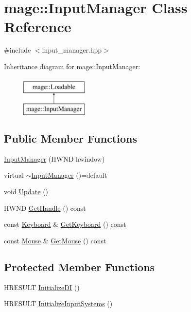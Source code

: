\hypertarget{classmage_1_1_input_manager}{}\section{mage\+:\+:Input\+Manager Class Reference}
\label{classmage_1_1_input_manager}


{\ttfamily \#include $<$input\+\_\+manager.\+hpp$>$}

Inheritance diagram for mage\+:\+:Input\+Manager\+:\begin{figure}[H]
\begin{center}
\leavevmode
\includegraphics[height=2.000000cm]{classmage_1_1_input_manager}
\end{center}
\end{figure}
\subsection*{Public Member Functions}
\begin{DoxyCompactItemize}
\item 
\hyperlink{classmage_1_1_input_manager_afc28df27a0251c242113a9761c007534}{Input\+Manager} (H\+W\+ND hwindow)
\item 
virtual \hyperlink{classmage_1_1_input_manager_a6e6e612b3b2bacb4ee5d0fcfde35a275}{$\sim$\+Input\+Manager} ()=default
\item 
void \hyperlink{classmage_1_1_input_manager_a5e516969ff4ae9876b98c28f48f93726}{Update} ()
\item 
H\+W\+ND \hyperlink{classmage_1_1_input_manager_a25d5f7f06b1c9d252d44d476f04b5ce3}{Get\+Handle} () const
\item 
const \hyperlink{classmage_1_1_keyboard}{Keyboard} \& \hyperlink{classmage_1_1_input_manager_a1702868136ae35014f27357b5b0f5ce8}{Get\+Keyboard} () const
\item 
const \hyperlink{classmage_1_1_mouse}{Mouse} \& \hyperlink{classmage_1_1_input_manager_a79f8294128ccd710ad80571483377067}{Get\+Mouse} () const
\end{DoxyCompactItemize}
\subsection*{Protected Member Functions}
\begin{DoxyCompactItemize}
\item 
H\+R\+E\+S\+U\+LT \hyperlink{classmage_1_1_input_manager_af3ca0717e37916463cc4f40c7d174b33}{Initialize\+DI} ()
\item 
H\+R\+E\+S\+U\+LT \hyperlink{classmage_1_1_input_manager_a34f114c4c667a4a14ce8236b35d308d8}{Initialize\+Input\+Systems} ()
\end{DoxyCompactItemize}

